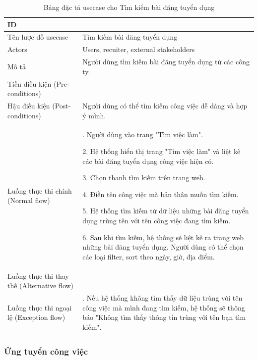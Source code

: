 \begin{table}[H]
    \centering
    \begin{tabular}{|>{\centering\arraybackslash}p{0.3\linewidth}|>{\raggedright\arraybackslash}p{0.7\linewidth}|} \hline 
         ID
& 5\\ \hline 
         
Tên lược đồ usecase
& Tìm kiếm bài đăng tuyển dụng\\ \hline 
         Actors
& Users, recuiter, external stakeholders\\ \hline 
         
Mô tả
& Người dùng tìm kiếm bài đăng tuyển dụng từ các công ty.\\ \hline 
         Tiền điều kiện (Pre-conditions)
& \\ \hline 
         
Hậu điều kiện (Post-conditions)& Người dùng có thể tìm kiếm công việc dễ dàng và hợp ý mình.\\ \hline 
         Luồng thực thi chính (Normal flow)& 1. Người dùng vào trang "Tìm việc làm".

2. Hệ thống hiển thị trang "Tìm việc làm" và liệt kê các bài đăng tuyển dụng công việc hiện có.

3. Chọn thanh tìm kiếm trên trang web.

4. Điền tên công việc mà bản thân muốn tìm kiếm.

5. Hệ thống tìm kiếm từ dữ liệu những bài đăng tuyển dụng trùng tên với tên công việc đang tìm kiếm.

6. Sau khi tìm kiếm, hệ thống sẽ liệt kê ra trang web những bài đăng tuyển dụng. Người dùng có thể chọn các loại filter, sort theo ngày, giờ, địa điểm.\\ \hline 
         
Luồng thực thi thay thế (Alternative flow)
& \\ \hline
 Luồng thực thi ngoại lệ (Exception flow)&6.1. Nếu hệ thống không tìm thấy dữ liệu trùng với tên công việc mà mình đang tìm kiếm, hệ thống sẽ thông báo "Không tìm thấy thông tin trùng với tên bạn tìm kiếm".\\\hline
    \end{tabular}
    \caption{Bảng đặc tả usecase cho Tìm kiếm bài đăng tuyển dụng}
    \label{tab:Tìm kiếm bài đăng tuyển dụng}
\end{table}

\subsubsection{Ứng tuyển công việc}


